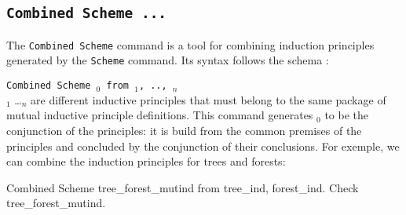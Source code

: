 \subsection[\tt Combined Scheme ...]{\tt Combined Scheme ...\label{CombinedScheme}
\label{combinedscheme}}
The {\tt Combined Scheme} command is a tool for combining 
induction principles generated by the {\tt Scheme} command.
Its syntax follows the schema :

\noindent
{\tt Combined Scheme {\ident$_0$} from {\ident$_1$}, .., {\ident$_n$}}\\
\ident$_1$ \ldots \ident$_n$ are different inductive principles that must belong to
the same package of mutual inductive principle definitions. This command
generates {\ident$_0$} to be the conjunction of the principles: it is
build from the common premises of the principles and concluded by the
conjunction of their conclusions. For exemple, we can combine the
induction principles for trees and forests:

\begin{coq_example*}
Combined Scheme tree_forest_mutind from tree_ind, forest_ind.
Check tree_forest_mutind.
\end{coq_example*}

%

